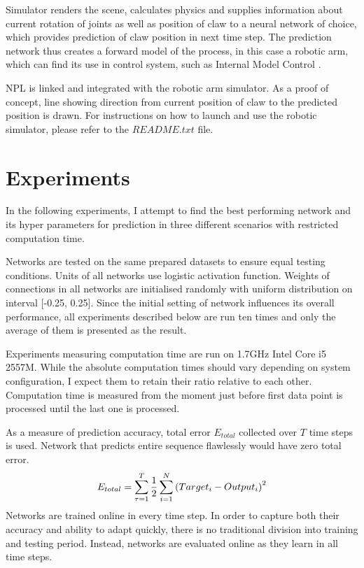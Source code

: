 \documentclass[12pt,oneside]{fithesis2}
\begin{document}
Simulator renders the scene, calculates physics and supplies information about current rotation of joints as well as position of claw to a neural network of choice, which provides prediction of claw position in next time step. The prediction network thus creates a forward model of the process, in this case a robotic arm, which can find its use in control system, such as Internal Model Control \cite{internal-model-control}. \par
NPL is linked and integrated with the robotic arm simulator. As a proof of concept, line showing direction from current position of claw to the predicted position is drawn. For instructions on how to launch and use the robotic simulator, please refer to the $README.txt$ file.

\chapter{Experiments}
In the following experiments, I attempt to find the best performing network and its hyper parameters for prediction in three different scenarios with restricted computation time.\par

Networks are tested on the same prepared datasets to ensure equal testing conditions. Units of all networks use logistic activation function. Weights of connections in all networks are initialised randomly with uniform distribution on interval [-0.25, 0.25]. Since the initial setting of network influences its overall performance, all experiments described below are run ten times and only the average of them is presented as the result.\par

Experiments measuring computation time are run on 1.7GHz Intel Core i5 2557M. While the absolute computation times should vary depending on system configuration, I expect them to retain their ratio relative to each other. Computation time is measured from the moment just before first data point is processed until the last one is processed.\par

As a measure of prediction accuracy, total error $E_{total}$ collected over $T$ time steps is used. Network that predicts entire sequence flawlessly would have zero total error. %
$$E_{total} = \sum\limits_{\tau = 1}^T {1 \over 2} \sum\limits_{i=1}^{N}\left(Target_i - Output_i\right)^2$$
Networks are trained online in every time step. In order to capture both their accuracy and ability to adapt quickly, there is no traditional division into training and testing period. Instead, networks are evaluated online as they learn in all time steps. \par
\end{document}
